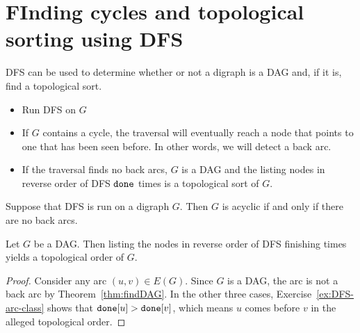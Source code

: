 \section{FInding cycles and topological sorting using DFS}

DFS can be used to determine whether or not a digraph is a DAG and, if it is, find a topological sort.

\begin{itemize}
\item Run DFS on $G$
\item If $G$ contains a cycle,  the traversal will eventually reach
a node that points to one that has been seen before. In other words, we
will detect a back arc. 
\item If the traversal finds no back arcs, $G$ is a DAG and the listing nodes in reverse order of DFS $\done$ times  is a topological sort of $G$.
\end{itemize}

\begin{Theorem}
\label{thm:findDAG}
Suppose that DFS is run on a digraph $G$. Then $G$ is acyclic if and
only if there are no back arcs.
\end{Theorem}

%
%

\begin{Theorem}
Let $G$ be a DAG. Then listing the nodes in reverse order of DFS
finishing times yields a topological order of $G$.
\end{Theorem}

\begin{proof} 
Consider any arc $(u,v)\in E(G)$. Since $G$ is a DAG,
the arc is not a back arc by Theorem~\ref{thm:findDAG}. In the other three
cases, Exercise~\ref{ex:DFS-arc-class} shows that $\done[u] > \done[v]$,
which means $u$ comes before $v$ in the alleged topological order.
\end{proof}

